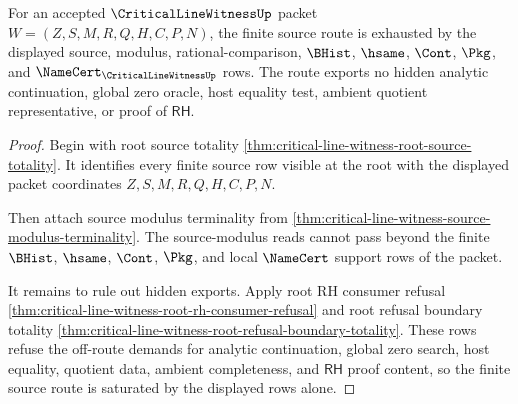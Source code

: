 \begin{theorem}
\label{thm:critical-line-witness-finite-source-route-saturation}
For an accepted $\CriticalLineWitnessUp$ packet $W=(Z,S,M,R,Q,H,C,P,N)$, the
finite source route is exhausted by the displayed source, modulus,
rational-comparison, $\BHist$, $\hsame$, $\Cont$, $\Pkg$, and
$\NameCert_{\CriticalLineWitnessUp}$ rows. The route exports no hidden analytic
continuation, global zero oracle, host equality test, ambient quotient
representative, or proof of $\mathsf{RH}$.
\end{theorem}
\begin{proof}
Begin with root source totality
\autoref{thm:critical-line-witness-root-source-totality}. It identifies every
finite source row visible at the root with the displayed packet coordinates
$Z,S,M,R,Q,H,C,P,N$.

Then attach source modulus terminality from
\autoref{thm:critical-line-witness-source-modulus-terminality}. The
source-modulus reads cannot pass beyond the finite $\BHist$, $\hsame$,
$\Cont$, $\Pkg$, and local $\NameCert$ support rows of the packet.

It remains to rule out hidden exports. Apply root RH consumer refusal
\autoref{thm:critical-line-witness-root-rh-consumer-refusal} and root refusal
boundary totality
\autoref{thm:critical-line-witness-root-refusal-boundary-totality}. These
rows refuse the off-route demands for analytic continuation, global zero
search, host equality, quotient data, ambient completeness, and
$\mathsf{RH}$ proof content, so the finite source route is saturated by the
displayed rows alone.
\end{proof}
